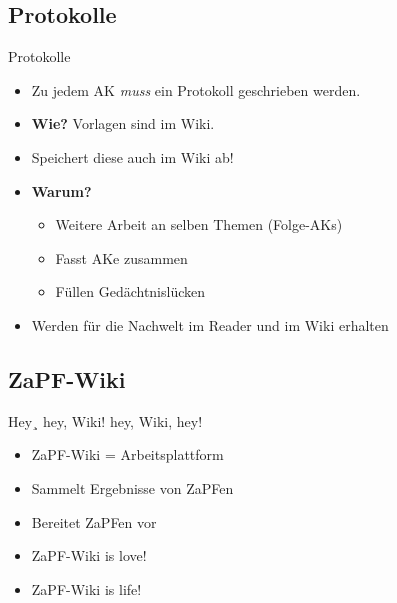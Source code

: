 \documentclass[compress,]{beamer}
\begin{document}

\subsection{Protokolle}

\begin{frame}{Protokolle}

  \begin{itemize}
  \item<1-> Zu jedem AK \emph{muss} ein Protokoll geschrieben werden.
  \item<2-> \textbf{Wie?} Vorlagen sind im Wiki.

  \item<4-> Speichert diese auch im Wiki ab!
  \item<4-> \textbf{Warum?}
    \begin{itemize}
    \item<5-> Weitere Arbeit an selben Themen (Folge-AKs)
    \item<6-> Fasst AKe zusammen
    \item<7-> Füllen Gedächtnislücken
    \end{itemize}
  \item<8-> Werden für die Nachwelt im Reader und im Wiki erhalten
  \end{itemize}

\end{frame}


\subsection{ZaPF-Wiki}

\begin{frame}{Hey¸ hey, Wiki! hey, Wiki, hey!}

  \begin{itemize}[<+->]
  \item ZaPF-Wiki = Arbeitsplattform
  \item Sammelt Ergebnisse von ZaPFen
  \item Bereitet ZaPFen vor
  \item \Huge{ZaPF-Wiki is love!}
  \item \Huge{ZaPF-Wiki is life!}
  \end{itemize}

\end{frame}
\end{document}
